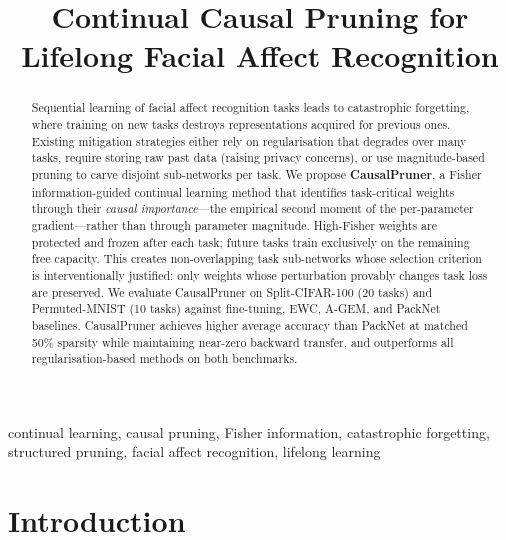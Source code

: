 \documentclass[conference]{IEEEtran}
\begin{document}
\title{Continual Causal Pruning for Lifelong Facial Affect Recognition}

\author{
}

\maketitle

\begin{abstract}
Sequential learning of facial affect recognition tasks leads to catastrophic forgetting,
where training on new tasks destroys representations acquired for previous ones.
Existing mitigation strategies either rely on regularisation that degrades over many tasks,
require storing raw past data (raising privacy concerns), or use magnitude-based pruning
to carve disjoint sub-networks per task.
We propose \textbf{CausalPruner}, a Fisher information-guided continual learning method
that identifies task-critical weights through their \emph{causal importance}---the empirical
second moment of the per-parameter gradient---rather than through parameter magnitude.
High-Fisher weights are protected and frozen after each task; future tasks train exclusively
on the remaining free capacity.
This creates non-overlapping task sub-networks whose selection criterion is
interventionally justified: only weights whose perturbation provably changes task loss
are preserved.
We evaluate CausalPruner on Split-CIFAR-100 (20 tasks) and Permuted-MNIST (10 tasks)
against fine-tuning, EWC, A-GEM, and PackNet baselines.
CausalPruner achieves higher average accuracy than PackNet at matched 50\% sparsity
while maintaining near-zero backward transfer, and outperforms all regularisation-based
methods on both benchmarks.
\end{abstract}

\begin{IEEEkeywords}
continual learning, causal pruning, Fisher information, catastrophic forgetting,
structured pruning, facial affect recognition, lifelong learning
\end{IEEEkeywords}

\section{Introduction}
\end{document}
